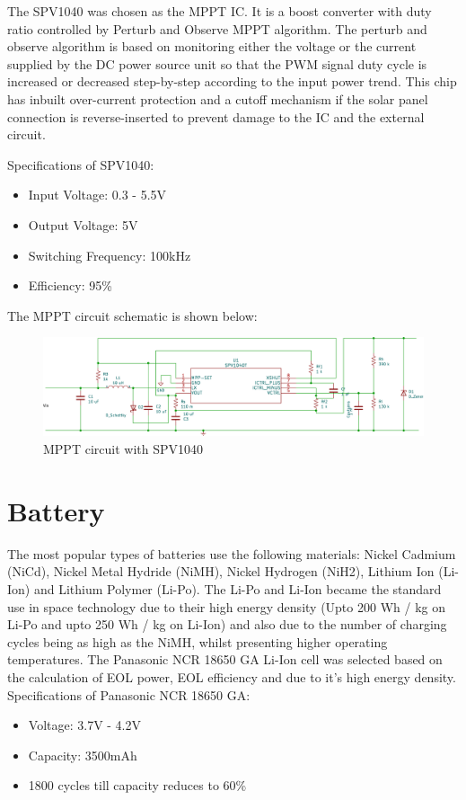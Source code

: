The SPV1040 was chosen as the MPPT IC. It is a boost converter with duty ratio controlled by Perturb and Observe MPPT algorithm. The perturb and observe algorithm is based on monitoring either the voltage or the current supplied by the DC power source unit so that the PWM signal duty cycle is increased or decreased step-by-step according to the input power trend. This chip has inbuilt over-current protection and a cutoff mechanism if the solar panel connection is reverse-inserted to prevent damage to the IC and the external circuit.

Specifications of  SPV1040:
	\begin{itemize}
	\item Input Voltage: 0.3 - 5.5V
	\item Output Voltage: 5V
	\item Switching Frequency: 100kHz
	\item Efficiency: 95\%
\end{itemize}
The MPPT circuit schematic is shown below:
 	\begin{figure}[ht]
	\centering
	\includegraphics[width=\columnwidth]{mppt.pdf}
	\caption{MPPT circuit with SPV1040}
	\label{fig:mpptsch}
\end{figure}

\section[Battery]{Battery}
The most popular types of batteries use the following materials: Nickel Cadmium
(NiCd), Nickel Metal Hydride (NiMH), Nickel Hydrogen (NiH2), Lithium Ion
(Li-Ion) and Lithium Polymer (Li-Po). The Li-Po and Li-Ion became the standard use in space technology due to their
high energy density (Upto 200 Wh / kg on Li-Po and upto 250 Wh / kg on Li-Ion) and also due to
the number of charging cycles being as high as the NiMH, whilst presenting higher
operating temperatures. 
The Panasonic NCR 18650 GA Li-Ion cell was selected based on the calculation of EOL power, EOL efficiency and due to it's high energy density.
Specifications of Panasonic NCR 18650 GA:
\begin{itemize}
	\item Voltage: 3.7V - 4.2V
	\item Capacity: 3500mAh
	\item 1800 cycles till capacity reduces to 60\%
\end{itemize}
